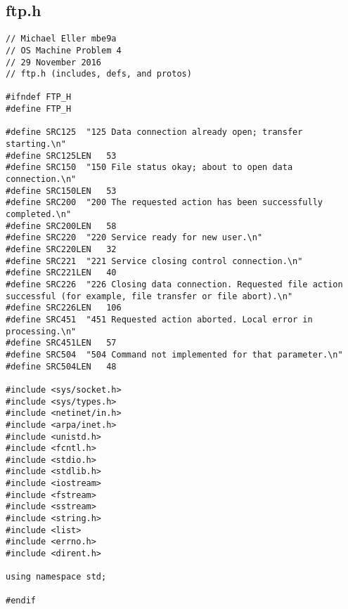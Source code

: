 \documentclass[12pt,letter,titlepage]{article}
\begin{document}
\subsection*{ftp.h}{
\scriptsize{
\begin{verbatim}
// Michael Eller mbe9a
// OS Machine Problem 4
// 29 November 2016
// ftp.h (includes, defs, and protos)

#ifndef FTP_H
#define FTP_H

#define SRC125	"125 Data connection already open; transfer starting.\n"
#define SRC125LEN	53
#define SRC150	"150 File status okay; about to open data connection.\n"
#define SRC150LEN	53
#define SRC200	"200 The requested action has been successfully completed.\n"
#define SRC200LEN	58
#define SRC220	"220 Service ready for new user.\n"
#define SRC220LEN	32
#define SRC221	"221 Service closing control connection.\n"
#define SRC221LEN	40
#define SRC226	"226 Closing data connection. Requested file action successful (for example, file transfer or file abort).\n"
#define SRC226LEN	106
#define SRC451	"451 Requested action aborted. Local error in processing.\n"
#define SRC451LEN	57
#define SRC504	"504 Command not implemented for that parameter.\n"
#define SRC504LEN	48

#include <sys/socket.h>
#include <sys/types.h>
#include <netinet/in.h>
#include <arpa/inet.h>
#include <unistd.h>
#include <fcntl.h>
#include <stdio.h>
#include <stdlib.h>
#include <iostream>
#include <fstream>
#include <sstream>
#include <string.h>
#include <list>
#include <errno.h>
#include <dirent.h>

using namespace std;

#endif
\end{verbatim}
}}
\end{document}
